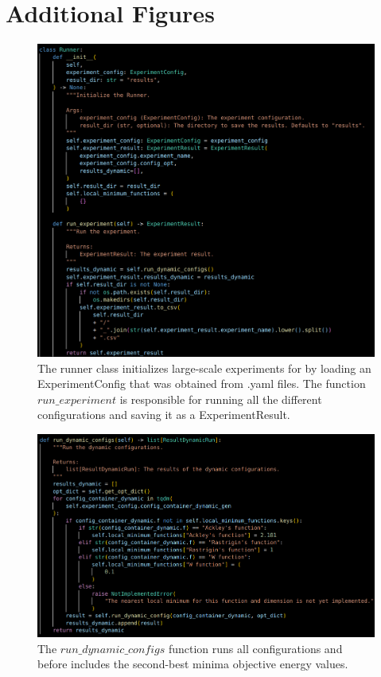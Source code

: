 \documentclass[a4paper, 11pt]{article}
\begin{document}
\section*{Additional Figures}
\begin{figure}[!ht]
\centering
\includegraphics[width=1\textwidth]{imgs/runner1.png}
\caption{The runner class initializes large-scale experiments for by loading an ExperimentConfig that was obtained from .yaml files. The function $run\_experiment$ is responsible for running all the different configurations and saving it as a ExperimentResult.} \vspace{-1em}
\label{fig:runner1}
\end{figure}

\begin{figure}[!ht]
\centering
\includegraphics[width=1\textwidth]{imgs/runner2.png}
\caption{The $run\_dynamic\_configs$ function runs all configurations and before includes the second-best minima objective energy values.} \vspace{-1em}
\label{fig:runner2}
\end{figure}
\end{document}
